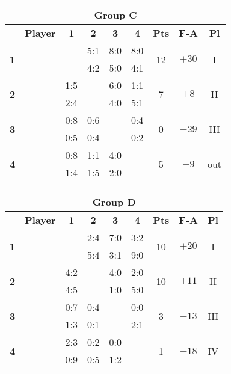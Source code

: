 \documentclass[10pt]{article}
\newcommand{\red}{\color{red}}
\newcommand{\blue}{\color{blue}}
\newcommand{\blank}{\cellcolor[gray]{.5}}
\begin{document}
\vspace{.5cm}

\hspace{-5cm}
\begin{tabular}{|c|p{2.8cm}|c|c|c|c|c|c|c|}
	\multicolumn{9}{c}{\bf Group C} \\ \hline
	& \bf Player & \bf1 & \bf2 & \bf3 & \bf4 & \bf Pts & \bf F-A & \bf Pl \\ \hline
	\multirow{2}{*}{\bf1}&\multirow{2}{*}{}    & \blank & \red5:1 & \red8:0 & \red8:0 &\multirow{2}{*}{12}&\multirow{2}{*}{$+30$}&\multirow{2}{*}{I} \\  && \blank & \red4:2 & \red5:0 & \red4:1 &&& \\ \hline
	\multirow{2}{*}{\bf2}&\multirow{2}{*}{}   & \blue1:5 & \blank & \red6:0 & 1:1 &\multirow{2}{*}{7}&\multirow{2}{*}{$+8$}&\multirow{2}{*}{II} \\  && \blue2:4 & \blank & \red4:0 & \red5:1 &&& \\ \hline
	\multirow{2}{*}{\bf3}&\multirow{2}{*}{}  & \blue0:8 & \blue0:6 & \blank & \blue0:4 &\multirow{2}{*}{0}&\multirow{2}{*}{$-29$}&\multirow{2}{*}{III} \\  && \blue0:5 & \blue0:4 & \blank & \blue0:2 &&& \\ \hline
	\multirow{2}{*}{\bf4}&\multirow{2}{*}{}& \blue0:8 & 1:1 & \red4:0 & \blank &\multirow{2}{*}{5}&\multirow{2}{*}{$-9$}&\multirow{2}{*}{\footnotesize out} \\&& \blue1:4 & \blue1:5 & \red2:0 & \blank &&& \\ \hline
\end{tabular}
\hspace{0.2cm}
\begin{tabular}{|c|p{2.8cm}|c|c|c|c|c|c|c|}
	\multicolumn{9}{c}{\bf Group D} \\ \hline
	& \bf Player & \bf1 & \bf2 & \bf3 & \bf4 & \bf Pts & \bf F-A & \bf Pl \\ \hline
	\multirow{2}{*}{\bf1}&\multirow{2}{*}{}       & \blank & \blue2:4 & \red7:0 & \red3:2 &\multirow{2}{*}{10}&\multirow{2}{*}{$+20$}&\multirow{2}{*}{I} \\  && \blank & \red5:4 & \red3:1 & \red9:0 &&& \\ \hline
	\multirow{2}{*}{\bf2}&\multirow{2}{*}{}& \red4:2 & \blank & \red4:0 & \red2:0 &\multirow{2}{*}{10}&\multirow{2}{*}{$+11$}&\multirow{2}{*}{II} \\  && \blue4:5 & \blank & \red1:0 & \red5:0 &&& \\ \hline
	\multirow{2}{*}{\bf3}&\multirow{2}{*}{}      & \blue0:7 & \blue0:4 & \blank & 0:0 &\multirow{2}{*}{3}&\multirow{2}{*}{$-13$}&\multirow{2}{*}{III} \\ && \blue1:3 & \blue0:1 & \blank & \red2:1 &&& \\ \hline
	\multirow{2}{*}{\bf4}&\multirow{2}{*}{}   & \blue2:3 & \blue0:2 & 0:0 & \blank &\multirow{2}{*}{1}&\multirow{2}{*}{$-18$}&\multirow{2}{*}{IV} \\   && \blue0:9 & \blue0:5 & \blue1:2 & \blank &&& \\ \hline
\end{tabular}
\hspace{-5cm}
\end{document}
